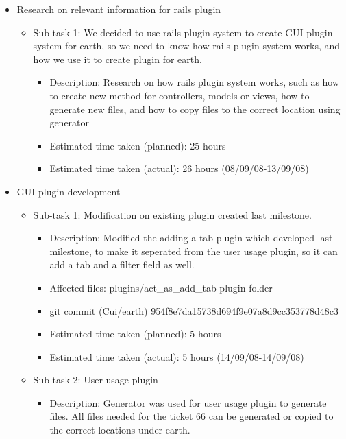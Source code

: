 \begin{itemize}
    \item Research on relevant information for rails plugin
        \begin{itemize}
            \item Sub-task 1: We decided to use rails plugin system to create GUI plugin system for earth, so we need to know how rails plugin system works, and how we use it to create plugin for earth.
                \begin{itemize}
                    \item Description: Research on how rails plugin system works, such as how to create new method for controllers, models or views, how to generate new files, and how to copy files to the correct location using generator
                    \item Estimated time taken (planned): 25 hours
                    \item Estimated time taken (actual):  26 hours (08/09/08-13/09/08)
                \end{itemize}
        \end{itemize}
    \item GUI plugin development
        \begin{itemize}
            \item Sub-task 1: Modification on existing plugin created last milestone.
                \begin{itemize}
                    \item Description: Modified the adding a tab plugin which developed last milestone, to make it seperated from the user usage plugin, so it can add a tab and a filter field as well.
                    \item Affected files: plugins/act\_as\_add\_tab plugin folder
                    \item git commit (Cui/earth) 954f8e7da15738d694f9e07a8d9cc353778d48c3
                    \item Estimated time taken (planned): 5 hours
                    \item Estimated time taken (actual): 5 hours (14/09/08-14/09/08)
                \end{itemize}
            \item Sub-task 2: User usage plugin
                \begin{itemize}
                    \item Description: Generator was used for user usage plugin to generate files. All files needed for the ticket 66 can be generated or copied to the correct locations under earth.

\end{itemize}
\end{itemize}
\end{itemize}

